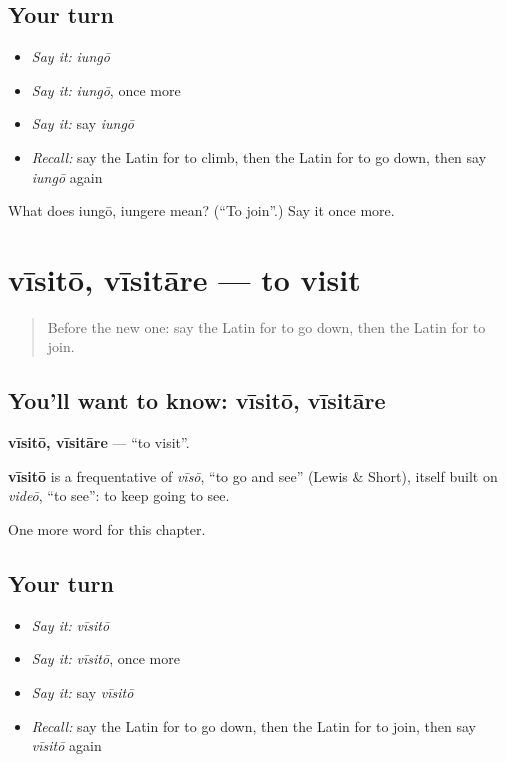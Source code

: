 \subsection*{Your turn}
\begin{itemize}
\raggedright
  \item \emph{Say it:} \emph{iungō}
  \item \emph{Say it:} \emph{iungō}, once more
  \item \emph{Say it:} say \emph{iungō}
  \item \emph{Recall:} say the Latin for to climb, then the Latin for to go down, then say \emph{iungō} again
\end{itemize}

\begin{tcolorbox}[breakable,colback=teal!4,colframe=teal!35!black,title={Before you move on}]
What does iungō, iungere mean? (\textquotedblleft{}To join\textquotedblright{}.) Say it once more.
\end{tcolorbox}
\section[vīsitō, vīsitāre]{vīsitō, vīsitāre — to visit}

\label{lesson:LA-C154-visito}



\begin{quote}
Before the new one: say the Latin for to go down, then the Latin for to join.
\end{quote}

\subsection*{You'll want to know: vīsitō, vīsitāre}
\textbf{vīsitō, vīsitāre} — \textquotedblleft{}to visit\textquotedblright{}.

\begin{cousinweb}
\textbf{vīsitō} is a frequentative of \emph{vīsō}, \textquotedblleft{}to go and see\textquotedblright{} (Lewis \& Short), itself built on \emph{videō}, \textquotedblleft{}to see\textquotedblright{}: to keep going to see.
\end{cousinweb}

\begin{grammarlens}[title={What you've built}]
One more word for this chapter.
\end{grammarlens}

\subsection*{Your turn}
\begin{itemize}
\raggedright
  \item \emph{Say it:} \emph{vīsitō}
  \item \emph{Say it:} \emph{vīsitō}, once more
  \item \emph{Say it:} say \emph{vīsitō}
  \item \emph{Recall:} say the Latin for to go down, then the Latin for to join, then say \emph{vīsitō} again
\end{itemize}


